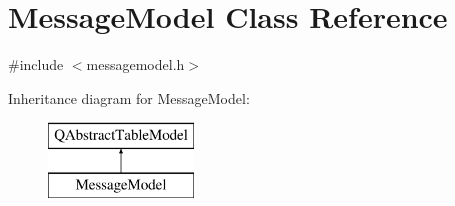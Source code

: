 \hypertarget{class_message_model}{}\section{Message\+Model Class Reference}
\label{class_message_model}


{\ttfamily \#include $<$messagemodel.\+h$>$}

Inheritance diagram for Message\+Model\+:\begin{figure}[H]
\begin{center}
\leavevmode
\includegraphics[height=2.000000cm]{class_message_model}
\end{center}
\end{figure}
